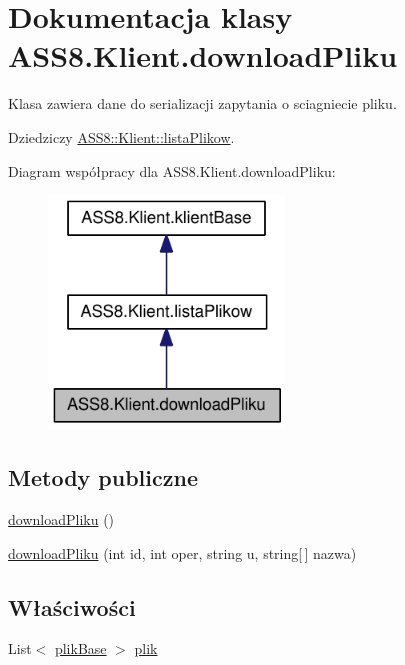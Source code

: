 \hypertarget{a00002}{
\section{Dokumentacja klasy ASS8.Klient.downloadPliku}
\label{d7/d46/a00002}
}
Klasa zawiera dane do serializacji zapytania o sciagniecie pliku.  


Dziedziczy \hyperlink{a00015}{ASS8::Klient::listaPlikow}.

Diagram współpracy dla ASS8.Klient.downloadPliku:\nopagebreak
\begin{figure}[H]
\begin{center}
\leavevmode
\includegraphics[width=178pt]{dd/da2/a00192}
\end{center}
\end{figure}
\subsection*{Metody publiczne}
\begin{CompactItemize}
\item 
\hyperlink{a00002_ac619cdb9edb6dd8f1113f6987dbbe35}{downloadPliku} ()
\item 
\hyperlink{a00002_d4cef9cd224ce0173bf52f3be46e4918}{downloadPliku} (int id, int oper, string u, string\mbox{[}$\,$\mbox{]} nazwa)
\end{CompactItemize}
\subsection*{Właściwości}
\begin{CompactItemize}
\item 
List$<$ \hyperlink{a00016}{plikBase} $>$ \hyperlink{a00002_afc812455fda8104711ad7f8e2508a6b}{plik}
\end{CompactItemize}
